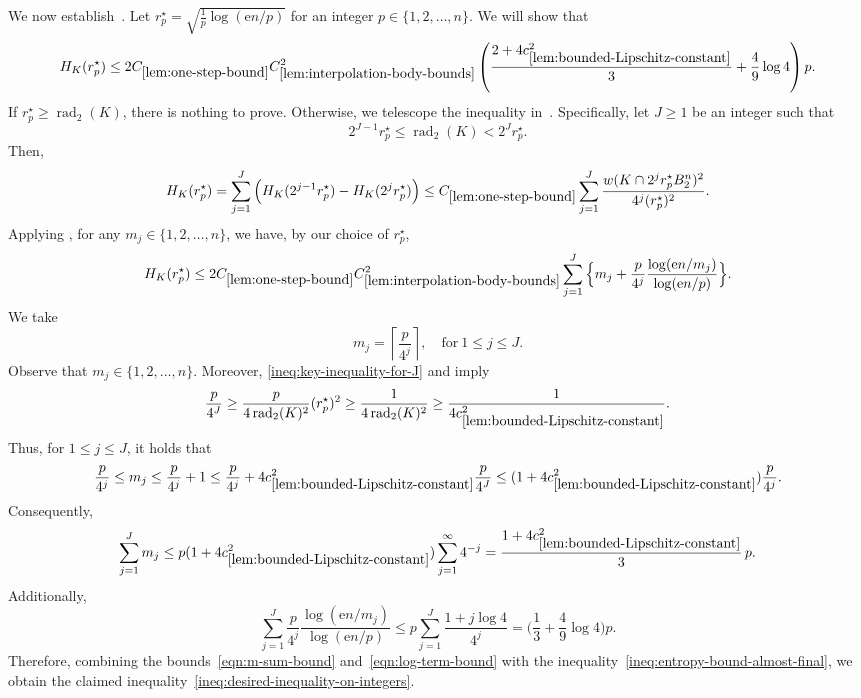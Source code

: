 \documentclass[11pt]{amsart}
\newcommand{\rad}{\operatorname{rad}_2}
\newcommand{\1}{\mathbf 1}
\newcommand{\e}{\mathrm{e}}
\newcommand{\ceil}[1]{\left\lceil #1 \right\rceil}
\theoremstyle{plain}
\begin{document}
We now establish~. Let $r^\star_p = \sqrt{\tfrac{1}{p} \log(\e n/p)}$ for an integer $p \in \{1, 2, \dots, n\}$.
We will show that
\begin{equation}
\label{ineq:desired-inequality-on-integers}
H_K(r^\star_p) \leq
2 C_{\ref{lem:one-step-bound}}
C_{\ref{lem:interpolation-body-bounds}}^2
\left(
\frac{2+4c_{\ref{lem:bounded-Lipschitz-constant}}^2}{3}
+\frac{4}{9}\log 4
\right)p.
\end{equation}
If $r^\star_p \geq \rad(K)$, there is nothing to prove. Otherwise, we telescope the inequality in~. Specifically, let $J \geq 1$ be an integer such that
\begin{equation}
\label{ineq:key-inequality-for-J}
2^{J-1} r^\star_p \leq \rad(K) < 2^J r^\star_p. 
\end{equation}
Then, 
\[
H_K(r^\star_p) = \sum_{j=1}^{J} \Big(H_K(2^{j-1} r^\star_p) - H_K(2^{j} r^\star_p)\Big)
\leq C_{\ref{lem:one-step-bound}} 
\sum_{j=1}^J \frac{w(K \cap 2^j r^\star_p B^n_2)^2}{4^j (r^\star_p)^2}.
\]
Applying , for any $m_j \in \{1, 2 ,\dots, n\}$, we have, by our choice of $r^\star_p$,
\begin{equation}
\label{ineq:entropy-bound-almost-final}
H_K(r^\star_p) 
\leq
2 C_{\ref{lem:one-step-bound}} 
C_{\ref{lem:interpolation-body-bounds}}^2
\sum_{j=1}^J 
\Big\{m_j + \frac{p}{4^j}\frac{\log(\e n/m_j)}{\log(\e n/p)}\Big\}.
\end{equation}
We take 
\[
m_j = \ceil{\frac{p}{4^j}}, \quad \mbox{for}~1 \leq j \leq J.
\] 
Observe that $m_j \in \{1, 2, \dots, n\}$. Moreover, \eqref{ineq:key-inequality-for-J} and  imply
\[
\frac{p}{4^J} \geq \frac{p}{4 \rad(K)^2} (r^\star_p)^2 \geq \frac{1}{4 \rad(K)^2} \geq \frac{1}{4 c_{\ref{lem:bounded-Lipschitz-constant}}^2}.
\]
Thus, for $1 \leq j \leq J$, it holds that
\[
\frac{p}{4^j} \leq m_j \leq \frac{p}{4^j} + 1 \leq \frac{p}{4^j} +
4 c_{\ref{lem:bounded-Lipschitz-constant}}^2 \frac{p}{4^J} 
\leq (1 + 4 c_{\ref{lem:bounded-Lipschitz-constant}}^2)
\frac{p}{4^j}. 
\]
Consequently, 
\begin{equation}
\label{eqn:m-sum-bound}
\sum_{j=1}^J 
m_j \leq p (1 + 4c_{\ref{lem:bounded-Lipschitz-constant}}^2)  
\sum_{j=1}^\infty 4^{-j}  =
\frac{1 + 4c_{\ref{lem:bounded-Lipschitz-constant}}^2}{3} \, p.
\end{equation}
Additionally, 
\begin{equation}
\label{eqn:log-term-bound}
\sum_{j=1}^J \frac{p}{4^j} \frac{\log(\e n/m_j)}{\log(\e n/p)} \leq 
p \sum_{j=1}^J \frac{1 + j \log 4}{4^j} = 
\Big(\frac{1}{3} + \frac{4}{9} \log 4\Big) p.  
\end{equation}
Therefore, combining the bounds~\eqref{eqn:m-sum-bound} and~\eqref{eqn:log-term-bound} with the inequality~\eqref{ineq:entropy-bound-almost-final}, 
we obtain the claimed inequality~\eqref{ineq:desired-inequality-on-integers}.
\end{document}
